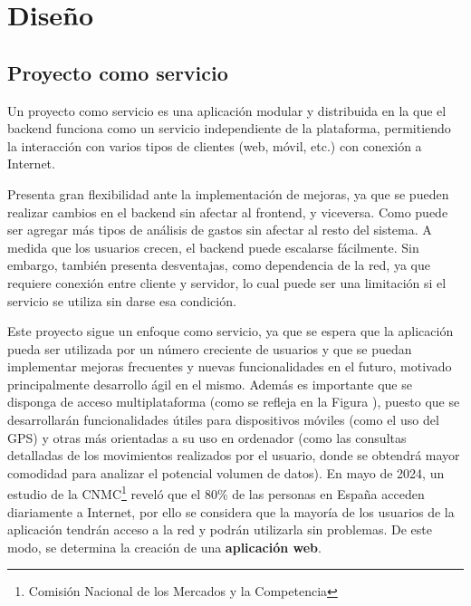 \chapter{Diseño}\label{chap:diseno}

\section{Proyecto como servicio}
Un proyecto como servicio es una aplicación modular y distribuida en la que el backend funciona como un servicio independiente de la plataforma, permitiendo la interacción con varios tipos de clientes (web, móvil, etc.) con conexión a Internet. 

Presenta gran flexibilidad ante la implementación de mejoras, ya que se pueden realizar cambios en el backend sin afectar al frontend, y viceversa. Como puede ser agregar más tipos de análisis de gastos sin afectar al resto del sistema. A medida que los usuarios crecen, el backend puede escalarse fácilmente. Sin embargo, también presenta desventajas, como dependencia de la red, ya que requiere conexión entre cliente y servidor, lo cual puede ser una limitación si el servicio se utiliza sin darse esa condición\cite{galster2014variability}.

Este proyecto sigue un enfoque como servicio, ya que se espera que la aplicación pueda ser utilizada por un número creciente de usuarios y que se puedan implementar mejoras frecuentes y nuevas funcionalidades en el futuro, motivado principalmente desarrollo ágil en el mismo. Además es importante que se disponga de acceso multiplataforma (como se refleja en la Figura \label{fig:proyecto_como_servicio}), puesto que se desarrollarán funcionalidades útiles para dispositivos móviles (como el uso del GPS) y otras más orientadas a su uso en ordenador (como las consultas detalladas de los movimientos realizados por el usuario, donde se obtendrá mayor comodidad para analizar el potencial volumen de datos). En mayo de 2024, un estudio de la CNMC\footnote{Comisión Nacional de los Mercados y la Competencia} reveló que el 80\% de las personas en España acceden diariamente a Internet, por ello se considera que la mayoría de los usuarios de la aplicación tendrán acceso a la red y podrán utilizarla sin problemas\cite{cnmc2024}. 
De este modo, se determina la creación de una \textbf{aplicación web}.

